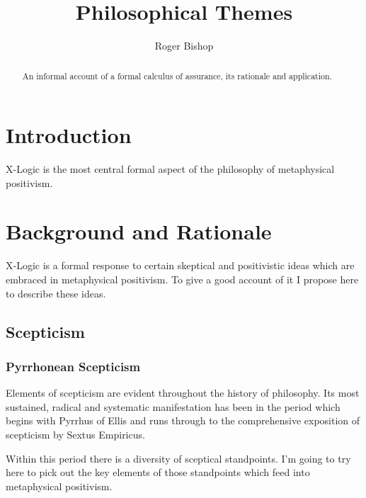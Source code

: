 \documentclass{rbjk}
\begin{document}
                                                                                   
\begin{article}
\begin{opening}  
\title{Philosophical Themes}
\author{Roger Bishop }

\begin{abstract}
An informal account of a formal calculus of assurance, its rationale and application.
\end{abstract}
\end{opening}

\setcounter{tocdepth}{4}
{\parskip-0pt\tableofcontents}

\section{Introduction}

X-Logic is the most central formal aspect of the philosophy of metaphysical positivism.

\section{Background and Rationale}

X-Logic is a formal response to certain skeptical and positivistic ideas which are embraced in metaphysical positivism.
To give a good account of it I propose here to describe these ideas.

\subsection{Scepticism}

\subsubsection{Pyrrhonean Scepticism}

Elements of scepticism are evident throughout the history of philosophy.
Its most sustained, radical and systematic manifestation has been in the period which begins with Pyrrhus of Ellis and runs through to the comprehensive exposition of scepticism by Sextus Empiricus.

Within this period there is a diversity of sceptical standpoints.
I'm going to try here to pick out the key elements of those standpoints which feed into metaphysical positivism.


\end{article}
\end{document}
